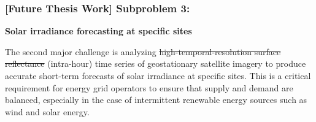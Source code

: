 \subsubsection{[Future Thesis Work] Subproblem 3:} 
    \textbf{Solar irradiance forecasting at specific sites} 

    The second major challenge is analyzing \st{high-temporal-resolution surface reflectance} (intra-hour) time series of geostationary satellite imagery to produce accurate short-term forecasts of solar irradiance at specific sites. 
    This is a critical requirement for energy grid operators to ensure that supply and demand are balanced, especially in the case of intermittent renewable energy sources such as wind and solar energy. 

    
        
